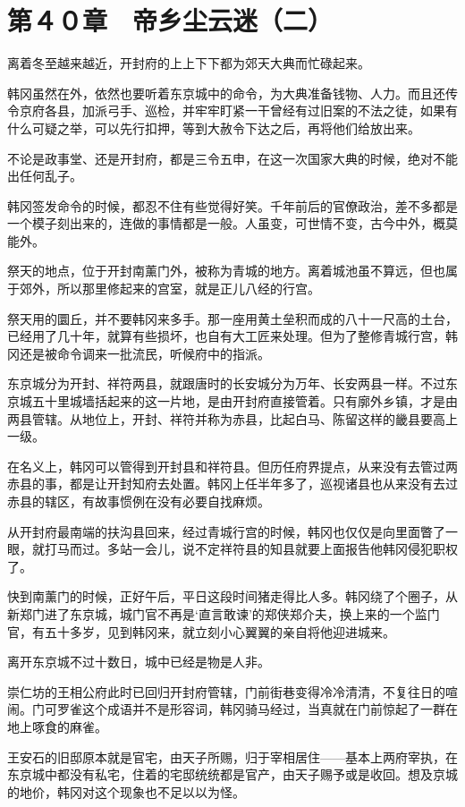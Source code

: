 \section{第４０章　帝乡尘云迷（二）}

离着冬至越来越近，开封府的上上下下都为郊天大典而忙碌起来。

韩冈虽然在外，依然也要听着东京城中的命令，为大典准备钱物、人力。而且还传令京府各县，加派弓手、巡检，并牢牢盯紧一干曾经有过旧案的不法之徒，如果有什么可疑之举，可以先行扣押，等到大赦令下达之后，再将他们给放出来。

不论是政事堂、还是开封府，都是三令五申，在这一次国家大典的时候，绝对不能出任何乱子。

韩冈签发命令的时候，都忍不住有些觉得好笑。千年前后的官僚政治，差不多都是一个模子刻出来的，连做的事情都是一般。人虽变，可世情不变，古今中外，概莫能外。

祭天的地点，位于开封南薰门外，被称为青城的地方。离着城池虽不算远，但也属于郊外，所以那里修起来的宫室，就是正儿八经的行宫。

祭天用的圜丘，并不要韩冈来多手。那一座用黄土垒积而成的八十一尺高的土台，已经用了几十年，就算有些损坏，也自有大工匠来处理。但为了整修青城行宫，韩冈还是被命令调来一批流民，听候府中的指派。

东京城分为开封、祥符两县，就跟唐时的长安城分为万年、长安两县一样。不过东京城五十里城墙括起来的这一片地，是由开封府直接管着。只有廓外乡镇，才是由两县管辖。从地位上，开封、祥符并称为赤县，比起白马、陈留这样的畿县要高上一级。

在名义上，韩冈可以管得到开封县和祥符县。但历任府界提点，从来没有去管过两赤县的事，都是让开封知府去处置。韩冈上任半年多了，巡视诸县也从来没有去过赤县的辖区，有故事惯例在没有必要自找麻烦。

从开封府最南端的扶沟县回来，经过青城行宫的时候，韩冈也仅仅是向里面瞥了一眼，就打马而过。多站一会儿，说不定祥符县的知县就要上面报告他韩冈侵犯职权了。

快到南薰门的时候，正好午后，平日这段时间猪走得比人多。韩冈绕了个圈子，从新郑门进了东京城，城门官不再是‘直言敢谏’的郑侠郑介夫，换上来的一个监门官，有五十多岁，见到韩冈来，就立刻小心翼翼的亲自将他迎进城来。

离开东京城不过十数日，城中已经是物是人非。

崇仁坊的王相公府此时已回归开封府管辖，门前街巷变得冷冷清清，不复往日的喧闹。门可罗雀这个成语并不是形容词，韩冈骑马经过，当真就在门前惊起了一群在地上啄食的麻雀。

王安石的旧邸原本就是官宅，由天子所赐，归于宰相居住——基本上两府宰执，在东京城中都没有私宅，住着的宅邸统统都是官产，由天子赐予或是收回。想及京城的地价，韩冈对这个现象也不足以以为怪。

